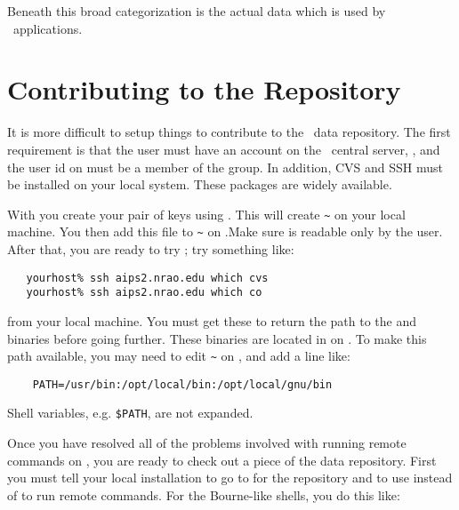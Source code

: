 \noindent
Beneath this broad categorization is the actual data which is used by
\aipspp\ applications.


\section{Contributing to the Repository}
\label{data repository contributing}

It is more difficult to setup things to contribute to the \aipspp\ data
repository. The first requirement is that the user must have an account
on the \aipspp\ central server, , and the user id on
 must be a member of the  group.
In addition, CVS and SSH must be installed on your local system. These
packages are widely available.

With  you create your pair of keys using .
This will create \verb+~+ on your local machine. You then
add this file to \verb+~+ on .Make
sure  is readable only by the user. After that, you
are ready to try ; try something like:

\begin{verbatim}
   yourhost% ssh aips2.nrao.edu which cvs
   yourhost% ssh aips2.nrao.edu which co
\end{verbatim}

\noindent
from your local machine. You must get these to return the path to the
 and  binaries before going further. These binaries
are located in  on . To make
this path available, you may need to edit \verb+~+ on
, and add a line like:

\begin{verbatim}
    PATH=/usr/bin:/opt/local/bin:/opt/local/gnu/bin
\end{verbatim}

\noindent
Shell variables, e.g. \verb+$PATH+, are not expanded.

Once you have resolved all of the problems involved with running remote
commands on , you are ready to check out a piece
of the data repository. First you must tell your local 
installation to go to  for the repository and to
use  instead of  to run remote commands. For
the Bourne-like shells, you do this like:

